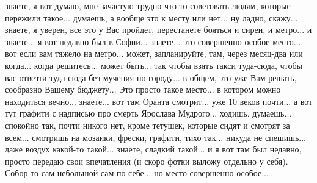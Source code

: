знаете, я вот думаю, мне зачастую трудно что то советовать людям, которые
пережили такое... думаешь, а вообще это к месту или нет... ну ладно, скажу...
знаете, я уверен, все это у Вас пройдет, перестанете бояться и сирен, и
метро... и знаете... я вот недавно был в Софии... знаете... это совершенно
особое место... вот если вам тяжело на метро... может, запланируйте, там, через
месяц-два или когда... когда решитесь... может быть... так чтобы взять такси
туда-сюда, чтобы вас отвезти туда-сюда без мучения по городу... в общем, это
уже Вам решать, сообразно Вашему бюджету... Это просто такое место... в котором
можно находиться вечно... знаете... вот там Оранта смотрит... уже 10 веков
почти... а вот тут графити с надписью про смерть Ярослава Мудрого... ходишь.
думаешь... спокойно так, почти никого нет, кроме тетушек, которые сидят и
смотрят за всем...  смотришь на мозаики, фрески, графити, тихо так... никуда не
спешишь... даже воздух какой-то такой... знаете, сладкий такой... и я вот там
был недавно, просто передаю свои впечатления (и скоро фотки выложу отдельно у
себя). Собор то сам небольшой сам по себе... но место совершенно особое...

